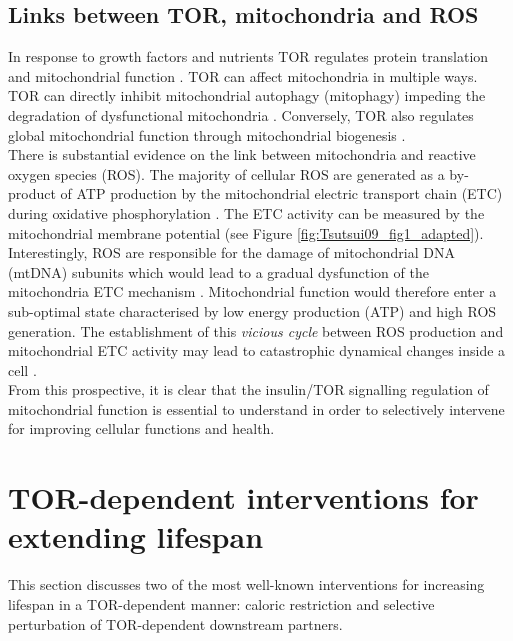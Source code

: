 \subsection{Links between TOR, mitochondria and ROS}
\label{subsec:Links between TOR, mitochondria and ROS}
In response to growth factors and nutrients TOR regulates protein translation and mitochondrial function \citep{Finley2009, Kaeberlein2007, Stanfel2009, Kaeberlein2010}. TOR can affect mitochondria in multiple ways. TOR can directly inhibit mitochondrial autophagy (mitophagy) impeding the degradation of dysfunctional mitochondria \citep{Lee2012}. Conversely, TOR also regulates global mitochondrial function through mitochondrial biogenesis \citep{Hock2009}. \\
There is substantial evidence on the link between mitochondria and reactive oxygen species (ROS). The majority of cellular ROS are generated as a by-product of ATP production by the mitochondrial electric transport chain (ETC) during oxidative phosphorylation \citep{Murphy2009}. The ETC activity can be measured by the mitochondrial membrane potential (see Figure \ref{fig:Tsutsui09_fig1_adapted}). Interestingly, ROS are responsible for the damage of mitochondrial DNA (mtDNA) subunits \citep{Shokolenko2009} which would lead to a gradual dysfunction of the mitochondria ETC mechanism \citep{Turrens2003}. Mitochondrial function would therefore enter a sub-optimal state characterised by low energy production (ATP) and high ROS generation. The establishment of this \emph{vicious cycle} between ROS production and mitochondrial ETC activity may lead to catastrophic dynamical changes inside a cell \citep{Turrens2003}.\\
From this prospective, it is clear that the insulin/TOR signalling regulation of mitochondrial function is essential to understand in order to selectively intervene for improving cellular functions and health.


\section{TOR-dependent interventions for extending lifespan}
\label{sec:TOR-dependent interventions for extending lifespan}
This section discusses two of the most well-known interventions for increasing lifespan in a TOR-dependent manner: caloric restriction and selective perturbation of TOR-dependent downstream partners.

